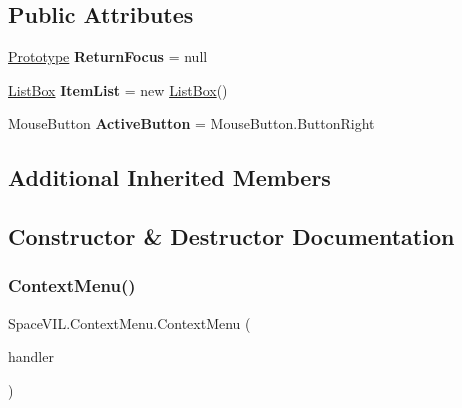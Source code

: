 \subsection*{Public Attributes}
\begin{DoxyCompactItemize}
\item 
\mbox{\label{class_space_v_i_l_1_1_context_menu_a2efee828c3568567902379c4e7c052e0}} 
\mbox{\hyperlink{class_space_v_i_l_1_1_prototype}{Prototype}} {\bfseries Return\+Focus} = null
\item 
\mbox{\label{class_space_v_i_l_1_1_context_menu_ab8a30424e07f90b2785003f0116d2563}} 
\mbox{\hyperlink{class_space_v_i_l_1_1_list_box}{List\+Box}} {\bfseries Item\+List} = new \mbox{\hyperlink{class_space_v_i_l_1_1_list_box}{List\+Box}}()
\item 
\mbox{\label{class_space_v_i_l_1_1_context_menu_ae2ff11e63ae6a6103872a7cb50b27e29}} 
Mouse\+Button {\bfseries Active\+Button} = Mouse\+Button.\+Button\+Right
\end{DoxyCompactItemize}
\subsection*{Additional Inherited Members}


\subsection{Constructor \& Destructor Documentation}
\mbox{\label{class_space_v_i_l_1_1_context_menu_ab5587faf5fcbe8af55b80295a481bdbc}} 
\subsubsection{\texorpdfstring{Context\+Menu()}{ContextMenu()}}
{\footnotesize\ttfamily Space\+V\+I\+L.\+Context\+Menu.\+Context\+Menu (\begin{DoxyParamCaption}\item[{\mbox{\hyperlink{class_space_v_i_l_1_1_window_layout}{Window\+Layout}}}]{handler }\end{DoxyParamCaption})\hspace{0.3cm}{\ttfamily [inline]}}



